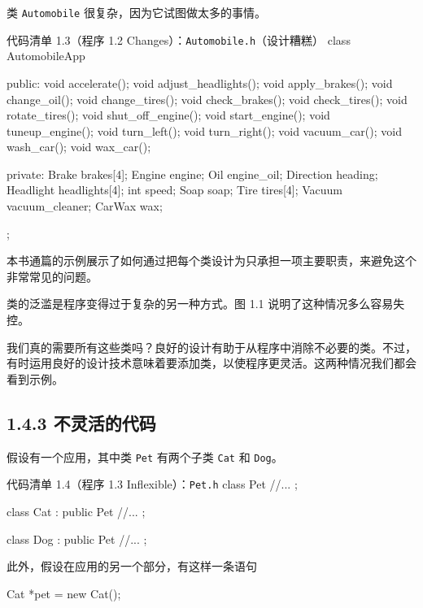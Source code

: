 类 \texttt{Automobile} 很复杂，因为它试图做太多的事情。

\begin{codeboxt}{代码清单 1.3（程序 1.2 Changes）：\texttt{Automobile.\allowbreak{}h}（设计糟糕）}
class AutomobileApp
{
public:
    void accelerate();
    void adjust_headlights();
    void apply_brakes();
    void change_oil();
    void change_tires();
    void check_brakes();
    void check_tires();
    void rotate_tires();
    void shut_off_engine();
    void start_engine();
    void tuneup_engine();
    void turn_left();
    void turn_right();
    void vacuum_car();
    void wash_car();
    void wax_car();
 
private:
    Brake brakes[4];
    Engine engine;
    Oil engine_oil;
    Direction heading;
    Headlight headlights[4];
    int speed;
    Soap soap;
    Tire tires[4];
    Vacuum vacuum_cleaner;
    CarWax wax;
};
\end{codeboxt}

本书通篇的示例展示了如何通过把每个类设计为只承担一项主要职责，来避免这个非常常见的问题。

类的泛滥是程序变得过于复杂的另一种方式。图 1.1 说明了这种情况多么容易失控。


我们真的需要所有这些类吗？良好的设计有助于从程序中消除不必要的类。不过，有时运用良好的设计技术意味着要添加类，以使程序更灵活。这两种情况我们都会看到示例。


\subsection{1.4.3 不灵活的代码}

假设有一个应用，其中类 \texttt{Pet} 有两个子类 \texttt{Cat} 和 \texttt{Dog}。

\begin{codeboxt}{代码清单 1.4（程序 1.3 Inflexible）：\texttt{Pet.h}}
class Pet
{
    //...
};

class Cat : public Pet
{
    //...
};

class Dog : public Pet
{
    //...
};
\end{codeboxt}

此外，假设在应用的另一个部分，有这样一条语句

\begin{codebox}
    Cat *pet = new Cat();
\end{codebox}

